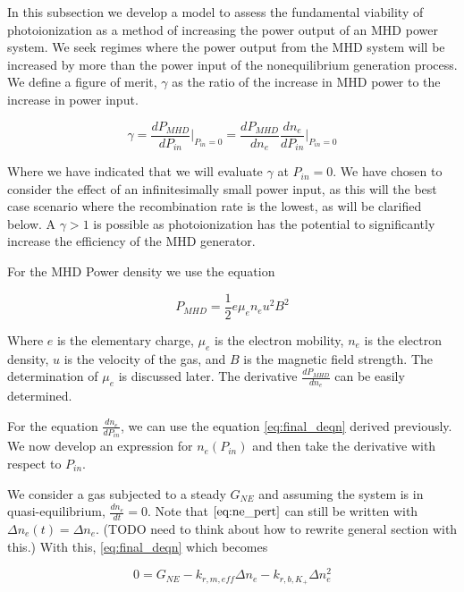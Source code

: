 In this subsection we develop a model to assess the fundamental viability of photoionization as a method of increasing the power output of an MHD power system. We seek regimes where the power output from the MHD system will be increased by more than the power input of the nonequilibrium generation process. We define a figure of merit, $\gamma$ as the ratio of the increase in MHD power to the increase in power input.


\begin{equation}
  \label{eq:beta_def}
\gamma = \frac{dP_{MHD}}{dP_{in}} \Big|_{P_{in}=0} = \frac{dP_{MHD}}{dn_{e}}\frac{dn_{e}}{dP_{in}}\Big|_{P_{in}=0}
\end{equation}

Where we have indicated that we will evaluate $\gamma$ at $P_{in} = 0$. We have chosen to consider the effect of an infinitesimally small power input, as this will the best case scenario where the recombination rate is the lowest, as will be clarified below. A $\gamma > 1$ is possible as photoionization has the potential to significantly increase the efficiency of the MHD generator. 

For the MHD Power density we use the equation

\begin{equation}
  \label{eq:mhd_power}
P_{MHD} = \frac{1}{2} e \mu_e n_e u^2 B^2
\end{equation}

Where $e$ is the elementary charge, $\mu_e$ is the electron mobility, $n_e$ is the electron density, $u$ is the velocity of the gas, and $B$ is the magnetic field strength.  The determination of $\mu_e$ is discussed later. The derivative $\frac{dP_{MHD}}{dn_{e}}$ can be easily determined. 

For the equation $\frac{dn_{e}}{dP_{in}}$, we can use the equation \ref{eq:final_deqn} derived previously. We now develop an expression for $n_{e}(P_{in})$ and then take the derivative with respect to $P_{in}$.

We consider a gas subjected to a steady $G_{NE}$ and assuming the system is in quasi-equilibrium, $\frac{dn_{e}}{dt} = 0$. Note that $\ref{eq:ne_pert}$ can still be written with $\Delta n_e(t) = \Delta n_{e}$. (TODO need to think about how to rewrite general section with this.) With this, \ref{eq:final_deqn} which becomes

\begin{equation}
0 = G_{NE} - k_{r, m, eff}\Delta n_{e} - k_{r, b, K_{+}}\Delta n_{e}^2
\end{equation}

